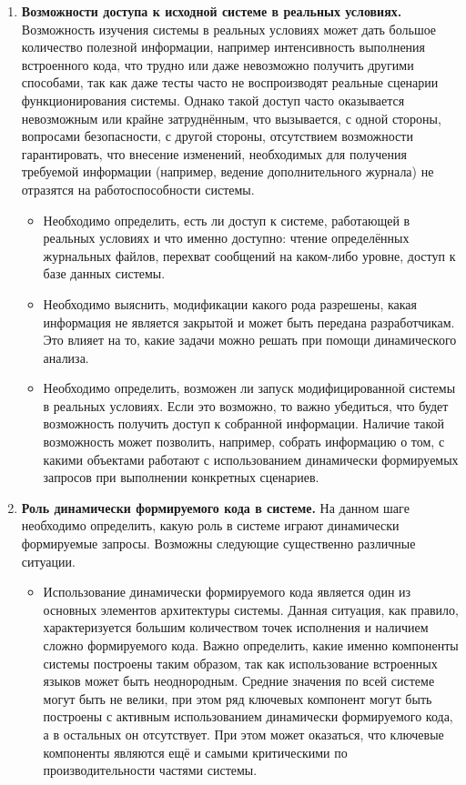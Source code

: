 \begin{enumerate}
  \item \textbf{Возможности доступа к исходной системе в реальных условиях.} Возможность изучения системы в реальных условиях может дать большое количество полезной информации, например интенсивность выполнения встроенного кода, что трудно или даже невозможно получить другими способами, так как даже тесты часто не воспроизводят реальные сценарии функционирования системы. Однако такой доступ часто оказывается невозможным или крайне затруднённым, что вызывается, с одной стороны, вопросами безопасности, с другой стороны, отсутствием возможности гарантировать, что внесение изменений, необходимых для получения требуемой информации (например, ведение дополнительного журнала) не отразятся на работоспособности системы.  
  \begin{itemize}
    \item Необходимо определить, есть ли доступ к системе, работающей в реальных условиях и что именно доступно: чтение определённых журнальных файлов, перехват сообщений на каком-либо уровне, доступ к базе данных системы.
    \item Необходимо выяснить, модификации какого рода разрешены, какая информация не является закрытой и может быть передана разработчикам. Это влияет на то, какие задачи можно решать при помощи динамического анализа.
    \item Необходимо определить, возможен ли запуск модифицированной системы в реальных условиях. Если это возможно, то важно убедиться, что будет возможность получить доступ к собранной информации. Наличие такой возможность может позволить, например, собрать информацию о том, с какими объектами работают с использованием динамически формируемых запросов при выполнении конкретных сценариев.
  \end{itemize}

  
  \item \textbf{Роль динамически формируемого кода в системе.} На данном шаге необходимо определить, какую роль в системе играют динамически формируемые запросы. Возможны следующие существенно различные ситуации.
  \begin{itemize}
    \item Использование динамически формируемого кода является один из основных элементов архитектуры системы. Данная ситуация, как правило, характеризуется большим количеством точек исполнения и наличием сложно формируемого кода. Важно определить, какие именно компоненты системы построены таким образом, так как использование встроенных языков может быть неоднородным. Средние значения по всей системе могут быть не велики, при этом ряд ключевых компонент могут быть построены с активным использованием динамически формируемого кода, а в остальных он отсутствует. При этом может оказаться, что ключевые компоненты являются ещё и самыми критическими по производительности частями системы.
    

\end{itemize}
\end{enumerate}
